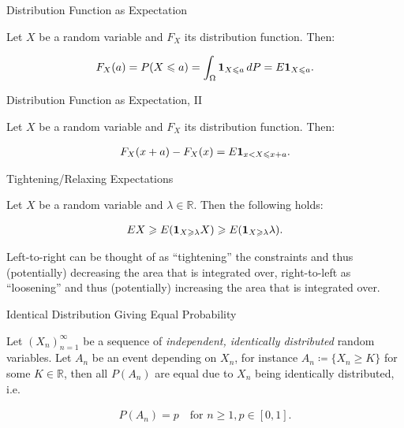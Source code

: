 \begin{observation}{}{Distribution Function as Expectation}

    Let $X$ be a random variable and $F_X$ its distribution function. Then:

        \begin{align*}
            F_X(a) = P(X \leqslant a) = \int_{\Omega} \mathbf{1}_{X \leqslant a} \, dP = E\mathbf{1}_{X \leqslant a}.
        \end{align*}

\end{observation}

\begin{observation}{}{Distribution Function as Expectation, II}

    Let $X$ be a random variable and $F_X$ its distribution function. Then:

        \begin{align*}
            F_X(x + a) - F_X(x) = E\mathbf{1}_{x < X \leqslant x + a}.
        \end{align*}

\end{observation}

\begin{observation}{}{Tightening/Relaxing Expectations}

    Let $X$ be a random variable and $\lambda \in \mathbb{R}$. Then the following  holds:

        \begin{align*}
            EX \geqslant E(\mathbf{1}_{X \geqslant \lambda}X) \geqslant E(\mathbf{1}_{X \geqslant \lambda}\lambda).
        \end{align*}

    Left-to-right can be thought of as ``tightening'' the constraints and thus (potentially) decreasing the area that is integrated over, right-to-left as ``loosening'' and thus (potentially) increasing the area that is integrated over.

\end{observation}

\begin{observation}{}{Identical Distribution Giving Equal Probability}

    Let $(X_n)_{n=1}^{\infty}$ be a sequence of \emph{independent, identically distributed} random variables. Let $A_n$ be an event depending on $X_n$, for instance $A_n \coloneqq \{ X_n \geq K \}$ for some $K \in \mathbb{R}$, then all $P(A_n)$ are equal due to $X_n$ being identically distributed, i.e.

        \begin{align*}
            P(A_n) = p \quad \textrm{for } n \geq 1, p \in [0,1].
        \end{align*}

\end{observation}

